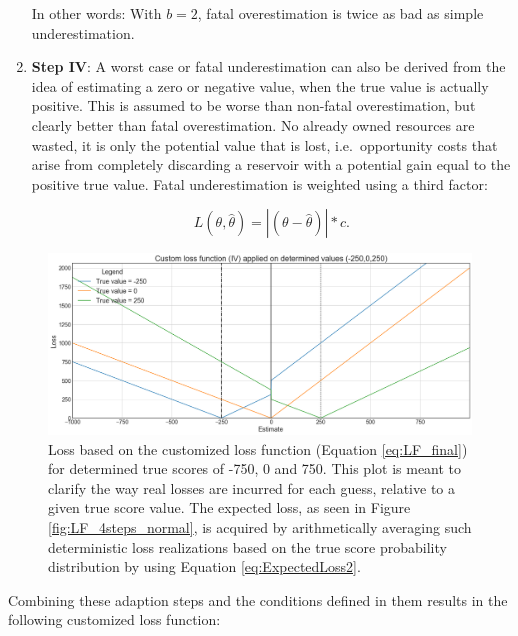 \begin{enumerate}
			In other words: With $b = 2$, fatal overestimation is twice as bad as simple underestimation.
			
			\item \textbf{Step IV}: A worst case or fatal underestimation can also be derived from the idea of estimating a zero or negative value, when the true value is actually positive. This is assumed to be worse than non-fatal overestimation, but clearly better than fatal overestimation. No already owned resources are wasted, it is only the potential value that is lost, i.e.\ opportunity costs that arise from completely discarding a reservoir with a potential gain equal to the positive true value. Fatal underestimation is weighted using a third factor:
					
			\begin{equation}\label{eq:LF_IV}
			L(\theta,\hat{\theta}) = |(\theta-\hat{\theta})|*c.
			\end{equation}			
		\end{enumerate}
		\begin{figure}[h]
			\includegraphics[width=1\textwidth]{Figures/LF4_det_values.png}
			\caption{Loss based on the customized loss function (Equation \ref{eq:LF_final}) for determined true scores of -750, 0 and 750. This plot is meant to clarify the way real losses are incurred for each guess, relative to a given true score value. The expected loss, as seen in Figure \ref{fig:LF_4steps_normal}, is acquired by arithmetically averaging such deterministic loss realizations based on the true score probability distribution by using Equation \ref{eq:ExpectedLoss2}.}\label{fig:LF4_det_values}
		\end{figure}
		
		Combining these adaption steps and the conditions defined in them results in the following customized loss function:
		
